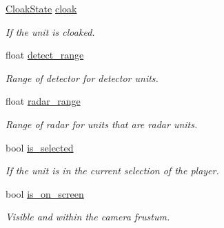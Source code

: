 \begin{DoxyCompactItemize}
\mbox{\label{classsc2_1_1_unit_ad06992e99ddf45f28be06550c61fabd4}} 
\hyperlink{classsc2_1_1_unit_a03f99cfaa8ad4f9bba6cd0bc5586c943}{Cloak\+State} \hyperlink{classsc2_1_1_unit_ad06992e99ddf45f28be06550c61fabd4}{cloak}
\begin{DoxyCompactList}\small\item\em If the unit is cloaked. \end{DoxyCompactList}\item 
\mbox{\label{classsc2_1_1_unit_a212a848d56f8ce323c1a8b5ac7bd0221}} 
float \hyperlink{classsc2_1_1_unit_a212a848d56f8ce323c1a8b5ac7bd0221}{detect\+\_\+range}
\begin{DoxyCompactList}\small\item\em Range of detector for detector units. \end{DoxyCompactList}\item 
\mbox{\label{classsc2_1_1_unit_a22e99532761f81474b7e666e08bf8727}} 
float \hyperlink{classsc2_1_1_unit_a22e99532761f81474b7e666e08bf8727}{radar\+\_\+range}
\begin{DoxyCompactList}\small\item\em Range of radar for units that are radar units. \end{DoxyCompactList}\item 
\mbox{\label{classsc2_1_1_unit_afc532e894e9496c843ac00abce343f41}} 
bool \hyperlink{classsc2_1_1_unit_afc532e894e9496c843ac00abce343f41}{is\+\_\+selected}
\begin{DoxyCompactList}\small\item\em If the unit is in the current selection of the player. \end{DoxyCompactList}\item 
\mbox{\label{classsc2_1_1_unit_a2766e02109100817ffd5135591746293}} 
bool \hyperlink{classsc2_1_1_unit_a2766e02109100817ffd5135591746293}{is\+\_\+on\+\_\+screen}
\begin{DoxyCompactList}\small\item\em Visible and within the camera frustum. \end{DoxyCompactList}\item 
\mbox{\label{classsc2_1_1_unit_aa730ea2bf474d4422e6c6a1e267945d4}} 

\end{DoxyCompactItemize}
